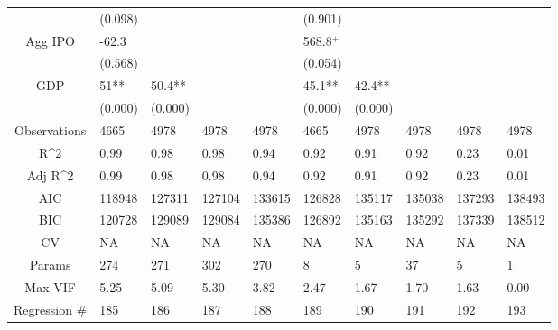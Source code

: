 \documentclass{article}
\begin{document}
\begin{table}[H]
\begin{tabular}{|clllllllll|}
   & (0.098) &  &  &  & (0.901) &  &  &  &  \\ 
  Agg IPO & -62.3 &  &  &  & 568.8$^{+}$ &  &  &  &  \\ 
   & (0.568) &  &  &  & (0.054) &  &  &  &  \\ 
  GDP & 51** & 50.4** &  &  & 45.1** & 42.4** &  &  &  \\ 
   & (0.000) & (0.000) &  &  & (0.000) & (0.000) &  &  &  \\ 
  \hline 
 Observations & 4665 & 4978 & 4978 & 4978 & 4665 & 4978 & 4978 & 4978 & 4978 \\ 
  R^2 & 0.99 & 0.98 & 0.98 & 0.94 & 0.92 & 0.91 & 0.92 & 0.23 & 0.01 \\ 
  Adj R^2 & 0.99 & 0.98 & 0.98 & 0.94 & 0.92 & 0.91 & 0.92 & 0.23 & 0.01 \\ 
  AIC & 118948 & 127311 & 127104 & 133615 & 126828 & 135117 & 135038 & 137293 & 138493 \\ 
  BIC & 120728 & 129089 & 129084 & 135386 & 126892 & 135163 & 135292 & 137339 & 138512 \\ 
  CV & NA & NA & NA & NA & NA & NA & NA & NA & NA \\ 
  Params & 274 & 271 & 302 & 270 & 8 & 5 & 37 & 5 & 1 \\ 
  Max VIF & 5.25 & 5.09 & 5.30 & 3.82 & 2.47 & 1.67 & 1.70 & 1.63 & 0.00 \\ 
  Regression \# & 185 & 186 & 187 & 188 & 189 & 190 & 191 & 192 & 193 \\ 
   \hline
\end{tabular}
 
\end{table}
\end{document}
